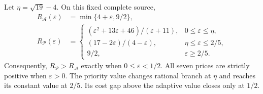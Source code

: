 \begin{theorem}
\label{thm:seven-private-curve}
Let $\eta=\sqrt{19}-4$. On this fixed complete source,
\begin{align}
 R_{\mathcal A}(\varepsilon)&=\min\{4+\varepsilon,9/2\},\label{eq:seven-random-A}\\
 R_{\mathcal P}(\varepsilon)&=
 \begin{cases}
 (\varepsilon^2+13\varepsilon+46)/(\varepsilon+11),&0\leq\varepsilon\leq\eta,\\
 (17-2\varepsilon)/(4-\varepsilon),&\eta\leq\varepsilon\leq2/5,\\
 9/2,&\varepsilon\geq2/5.
 \end{cases}\label{eq:seven-random-P}
\end{align}
Consequently, $R_{\mathcal P}>R_{\mathcal A}$ exactly when $0\leq\varepsilon<1/2$. All seven prices are strictly positive when $\varepsilon>0$. The priority value changes rational branch at $\eta$ and reaches its constant value at $2/5$. Its cost gap above the adaptive value closes only at $1/2$.
\end{theorem}
